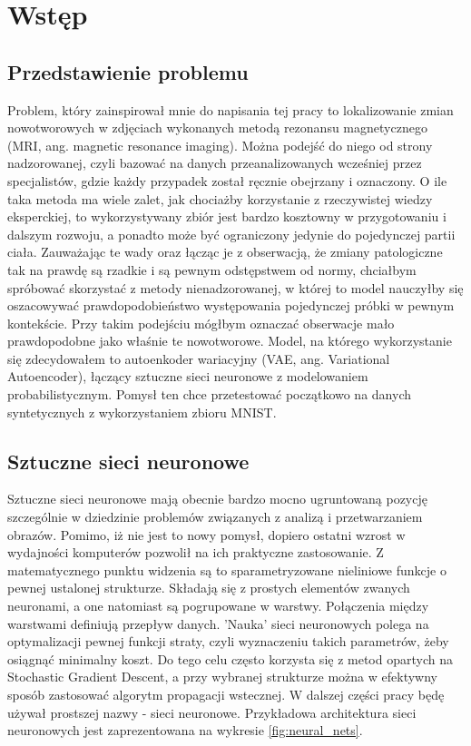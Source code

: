 \chapter{Wstęp}

\section{Przedstawienie problemu}

Problem, który zainspirował mnie do napisania tej pracy to lokalizowanie zmian nowotworowych w zdjęciach wykonanych metodą rezonansu magnetycznego (MRI, ang. magnetic resonance imaging). Można podejść do niego od strony nadzorowanej, czyli bazować na danych przeanalizowanych wcześniej przez specjalistów, gdzie każdy przypadek został ręcznie obejrzany i oznaczony. O ile taka metoda ma wiele zalet, jak chociażby korzystanie z rzeczywistej wiedzy eksperckiej, to wykorzystywany zbiór jest bardzo kosztowny w przygotowaniu i dalszym rozwoju, a ponadto może być ograniczony jedynie do pojedynczej partii ciała. Zauważając te wady oraz łącząc je z obserwacją, że zmiany patologiczne tak na prawdę są rzadkie i są pewnym odstępstwem od normy, chciałbym spróbować skorzystać z metody nienadzorowanej, w której to model nauczyłby się oszacowywać prawdopodobieństwo występowania pojedynczej próbki w pewnym kontekście. Przy takim podejściu mógłbym oznaczać obserwacje mało prawdopodobne jako właśnie te nowotworowe. Model, na którego wykorzystanie się zdecydowałem to autoenkoder wariacyjny (VAE, ang. Variational Autoencoder), łączący sztuczne sieci neuronowe z modelowaniem probabilistycznym. Pomysł ten chce przetestować początkowo na danych syntetycznych z wykorzystaniem zbioru MNIST.

\section{Sztuczne sieci neuronowe}

Sztuczne sieci neuronowe mają obecnie bardzo mocno ugruntowaną pozycję szczególnie w dziedzinie problemów związanych z analizą i przetwarzaniem obrazów. Pomimo, iż nie jest to nowy pomysł, dopiero ostatni wzrost w wydajności komputerów pozwolił na ich praktyczne zastosowanie. Z matematycznego punktu widzenia są to sparametryzowane nieliniowe funkcje o pewnej ustalonej strukturze. Składają się z prostych elementów zwanych neuronami, a one natomiast są pogrupowane w warstwy. Połączenia między warstwami definiują przepływ danych. 'Nauka' sieci neuronowych polega na optymalizacji pewnej funkcji straty, czyli wyznaczeniu takich parametrów, żeby osiągnąć minimalny koszt. Do tego celu często korzysta się z metod opartych na Stochastic Gradient Descent, a przy wybranej strukturze można w efektywny sposób zastosować algorytm propagacji wstecznej. W dalszej części pracy będę używał prostszej nazwy - sieci neuronowe. Przykładowa architektura sieci neuronowych jest zaprezentowana na wykresie \ref{fig:neural_nets}.

